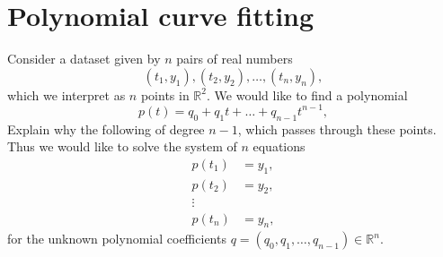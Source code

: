 \documentclass[10pt,a4paper]{article}
\newcommand{\R}{\mathbb{R}}
\theoremstyle{plain}
\theoremstyle{definition}
\begin{document}
\rhead{\today}

\fancyfoot[R] {\thepage}
\fancyfoot[C] {}

\listoftodos

\section{Polynomial curve fitting}

Consider a dataset given by \(n\) pairs of real numbers
\[
  (t_1,y_1), (t_2,y_2), \dots, (t_n, y_n),
\]
which we interpret as \(n\) points in \(\R^2\).
We would like to find a polynomial
\[
  p(t) = q_0 + q_1 t + \dots + q_{n-1} t^{n-1},
\]
Explain why the following of degree \(n-1\), which passes through these points.
Thus we would like to solve the system of \(n\) equations
\begin{equation}\label{poly}
  \begin{aligned}
    p(t_1) &= y_1,\\
    p(t_2) &= y_2,\\
    \vdots&\\
    p(t_n) &= y_n,
  \end{aligned}
\end{equation}
for the unknown polynomial coefficients \(q = (q_0,q_1,\dots,q_{n-1})\in \R^n\).
\end{document}
